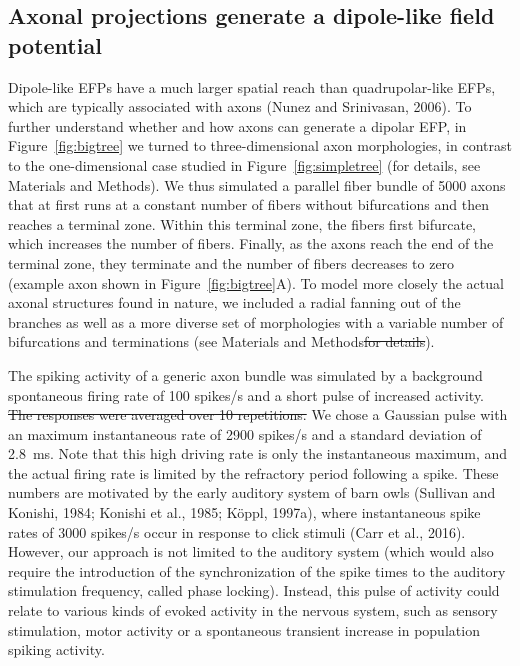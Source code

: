 \documentclass[]{article}
\providecommand{\DIFaddtex}[1]{{\protect\color{blue}\uwave{#1}}} %
\providecommand{\DIFdeltex}[1]{{\protect\color{red}\sout{#1}}}                      %
\providecommand{\DIFaddbegin}{} %
\providecommand{\DIFaddend}{} %
\providecommand{\DIFdelbegin}{} %
\providecommand{\DIFdelend}{} %
\providecommand{\DIFadd}[1]{\texorpdfstring{\DIFaddtex{#1}}{#1}} %
\providecommand{\DIFdel}[1]{\texorpdfstring{\DIFdeltex{#1}}{}} %
\begin{document}
\subsection{Axonal projections generate a dipole-like field
potential}\label{axonal-projections-generate-a-dipole-like-field-potential}

Dipole-like EFPs have a much larger spatial reach than quadrupolar-like
EFPs, which are typically associated with axons (Nunez and Srinivasan,
2006). To further understand whether and how axons can generate a
dipolar EFP, in Figure~\ref{fig:bigtree} we turned to three-dimensional
axon morphologies, in contrast to the one-dimensional case studied in
Figure~\ref{fig:simpletree} (for details, see Materials and Methods). We
thus simulated a parallel fiber bundle of 5000 axons that at first runs
at a constant number of fibers without bifurcations and then reaches a
terminal zone. Within this terminal zone, the fibers first bifurcate,
which increases the number of fibers. Finally, as the axons reach the
end of the terminal zone, they terminate and the number of fibers
decreases to zero (example axon shown in Figure~\ref{fig:bigtree}A). To
model more closely the actual axonal structures found in nature, we
included a radial fanning out of the branches as well as a more diverse
set of morphologies with a variable number of bifurcations and
terminations (\DIFaddbegin \DIFadd{for details, }\DIFaddend see Materials and Methods\DIFdelbegin \DIFdel{for details}\DIFdelend ).

The spiking activity of a generic axon bundle was simulated by a
background spontaneous firing rate of 100 spikes/s and a short pulse of
increased activity. \DIFdelbegin \DIFdel{The responses were averaged over 10 repetitions. }\DIFdelend We chose a Gaussian pulse with an maximum
instantaneous rate of 2900 spikes/s and a standard deviation of 2.8~ms.
Note that this high driving rate is only the instantaneous maximum, and
the actual firing rate is limited by the refractory period following a
spike. These numbers are motivated by the early auditory system of barn
owls (Sullivan and Konishi, 1984; Konishi et al., 1985; Köppl, 1997a),
where instantaneous spike rates of 3000 spikes/s occur in response to
click stimuli (Carr et al., 2016). However, our approach is not limited
to the auditory system (which would also require the introduction of the
synchronization of the spike times to the auditory stimulation
frequency, called phase locking). Instead, this pulse of activity could
relate to various kinds of evoked activity in the nervous system, such
as sensory stimulation, motor activity or a spontaneous transient
increase in population spiking activity.
\end{document}
